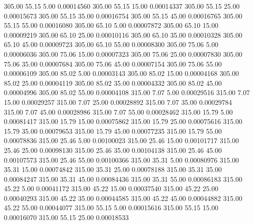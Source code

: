     305.00     55.15      5.00     0.00014560
    305.00     55.15     15.00     0.00014337
    305.00     55.15     25.00     0.00015673
    305.00     55.15     35.00     0.00016754
    305.00     55.15     45.00     0.00016765
    305.00     55.15     55.00     0.00016080
    305.00     65.10      5.00     0.00007872
    305.00     65.10     15.00     0.00009219
    305.00     65.10     25.00     0.00010116
    305.00     65.10     35.00     0.00010328
    305.00     65.10     45.00     0.00009723
    305.00     65.10     55.00     0.00008300
    305.00     75.06      5.00     0.00006036
    305.00     75.06     15.00     0.00007323
    305.00     75.06     25.00     0.00007830
    305.00     75.06     35.00     0.00007684
    305.00     75.06     45.00     0.00007154
    305.00     75.06     55.00     0.00006109
    305.00     85.02      5.00     0.00003143
    305.00     85.02     15.00     0.00004168
    305.00     85.02     25.00     0.00004119
    305.00     85.02     35.00     0.00004332
    305.00     85.02     45.00     0.00004996
    305.00     85.02     55.00     0.00004108
    315.00      7.07      5.00     0.00029516
    315.00      7.07     15.00     0.00029257
    315.00      7.07     25.00     0.00028892
    315.00      7.07     35.00     0.00029784
    315.00      7.07     45.00     0.00028986
    315.00      7.07     55.00     0.00028462
    315.00     15.79      5.00     0.00081417
    315.00     15.79     15.00     0.00075862
    315.00     15.79     25.00     0.00075616
    315.00     15.79     35.00     0.00079653
    315.00     15.79     45.00     0.00077235
    315.00     15.79     55.00     0.00078836
    315.00     25.46      5.00     0.00100023
    315.00     25.46     15.00     0.00101717
    315.00     25.46     25.00     0.00098130
    315.00     25.46     35.00     0.00104138
    315.00     25.46     45.00     0.00107573
    315.00     25.46     55.00     0.00100366
    315.00     35.31      5.00     0.00080976
    315.00     35.31     15.00     0.00074842
    315.00     35.31     25.00     0.00078188
    315.00     35.31     35.00     0.00084247
    315.00     35.31     45.00     0.00084436
    315.00     35.31     55.00     0.00086183
    315.00     45.22      5.00     0.00041172
    315.00     45.22     15.00     0.00037540
    315.00     45.22     25.00     0.00040293
    315.00     45.22     35.00     0.00044585
    315.00     45.22     45.00     0.00044882
    315.00     45.22     55.00     0.00044077
    315.00     55.15      5.00     0.00015616
    315.00     55.15     15.00     0.00016070
    315.00     55.15     25.00     0.00018533
